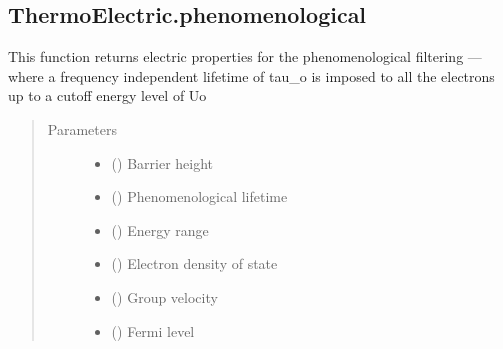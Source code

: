 \documentclass[letterpaper,10pt,english]{sphinxmanual}
\begin{document}
\subsection{ThermoElectric.phenomenological}
\label{\detokenize{autosummary/ThermoElectric.phenomenological:thermoelectric-phenomenological}}\label{\detokenize{autosummary/ThermoElectric.phenomenological::doc}}

\begin{fulllineitems}
\label{\detokenize{autosummary/ThermoElectric.phenomenological:ThermoElectric.phenomenological}}
\sphinxAtStartPar
This function returns electric properties for the phenomenological filtering —  where a frequency independent
lifetime of tau\_o is imposed to all the electrons up to a cutoff energy level of Uo
\begin{quote}\begin{description}
\item[{Parameters}] \leavevmode\begin{itemize}
\item {} 
\sphinxAtStartPar
{} () \textendash{} Barrier height

\item {} 
\sphinxAtStartPar
{} () \textendash{} Phenomenological lifetime

\item {} 
\sphinxAtStartPar
{} () \textendash{} Energy range

\item {} 
\sphinxAtStartPar
{} () \textendash{} Electron density of state

\item {} 
\sphinxAtStartPar
{} () \textendash{} Group velocity

\item {} 
\sphinxAtStartPar
{} () \textendash{} Fermi level


\end{itemize}
\end{description}
\end{quote}
\end{fulllineitems}
\end{document}
